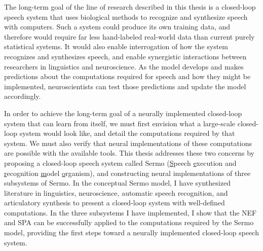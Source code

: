 The long-term goal of the line of research
described in this thesis
is a closed-loop speech system
that uses biological methods
to recognize and synthesize speech
with computers.
Such a system could produce its own training data,
and therefore would require
far less hand-labeled real-world data than
current purely statistical systems.
It would also enable interrogation
of how the system recognizes
and synthesizes speech,
and enable synergistic interactions
between researchers in linguistics
and neuroscience.
As the model develops and makes predictions
about the computations required for speech
and how they might be implemented,
neuroscientists can test those predictions
and update the model accordingly.

In order to achieve the long-term goal
of a neurally implemented closed-loop system
that can learn from itself,
we must first
envision what a large-scale closed-loop system
would look like,
and detail the computations required by that system.
We must also verify that neural implementations
of these computations
are possible with the available tools.
This thesis addresses these two concerns
by proposing a closed-loop speech system
called Sermo
(\underline{S}peech \underline{e}xecution and
\underline{r}ecognition \underline{m}odel \underline{o}rganism),
and constructing neural implementations
of three subsystems of Sermo.
In the conceptual Sermo model,
I have synthesized literature
in linguistics, neuroscience,
automatic speech recognition,
and articulatory synthesis
to present a closed-loop system
with well-defined computations.
In the three subsystems I have implemented,
I show that the NEF and SPA
can be successfully applied to
the computations required by the Sermo model,
providing the first steps
toward a neurally implemented closed-loop speech system.

